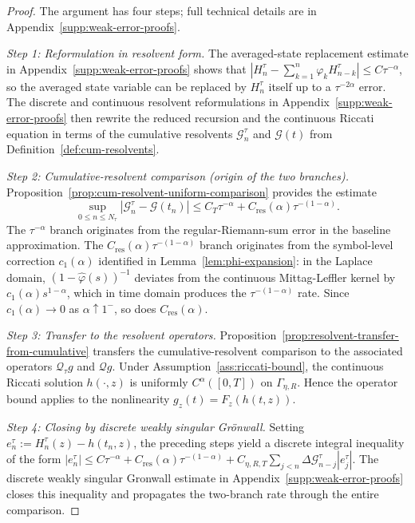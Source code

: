 \documentclass[letterpaper]{article}
\numberwithin{equation}{section}
\theoremstyle{definition}
\theoremstyle{remark}
\begin{document}
\begin{proof}
{The argument has four steps; full technical details are in Appendix~\ref{supp:weak-error-proofs}.

\medskip
\noindent\textit{Step 1: Reformulation in resolvent form.}
The averaged-state replacement estimate in Appendix~\ref{supp:weak-error-proofs} shows that
$|H_n^\tau - \sum_{k=1}^n\varphi_k H_{n-k}^\tau|\le C\tau^{-\alpha}$, so the averaged
state variable can be replaced by $H_n^\tau$ itself up to a $\tau^{-2\alpha}$
error. The discrete and continuous resolvent reformulations in Appendix~\ref{supp:weak-error-proofs} then
rewrite the reduced recursion and the continuous Riccati equation in terms of
the cumulative resolvents $\mathcal{G}_n^\tau$ and $\mathcal{G}(t)$ from
Definition~\ref{def:cum-resolvents}.

\medskip
\noindent\textit{Step 2: Cumulative-resolvent comparison (origin of the two branches).}
Proposition~\ref{prop:cum-resolvent-uniform-comparison} provides the estimate
\[
  \sup_{0\le n\le N_\tau}|\mathcal{G}_n^\tau-\mathcal{G}(t_n)|
  \le C_T\tau^{-\alpha}+C_{\mathrm{res}}(\alpha)\tau^{-(1-\alpha)}.
\]
The $\tau^{-\alpha}$ branch originates from the regular-Riemann-sum error in the baseline approximation. The $C_{\mathrm{res}}(\alpha)\tau^{-(1-\alpha)}$ branch originates from the symbol-level correction $c_1(\alpha)$ identified in Lemma~\ref{lem:phi-expansion}: in the Laplace domain, $(1-\hat\varphi(s))^{-1}$ deviates from the continuous Mittag-Leffler kernel by $c_1(\alpha)s^{1-\alpha}$, which in time domain produces the $\tau^{-(1-\alpha)}$ rate. Since $c_1(\alpha)\to0$ as $\alpha\uparrow1^-$, so does $C_{\mathrm{res}}(\alpha)$.

\medskip
\noindent\textit{Step 3: Transfer to the resolvent operators.}
Proposition~\ref{prop:resolvent-transfer-from-cumulative} transfers the
cumulative-resolvent comparison to the associated operators $\mathcal{Q}_\tau g$
and $\mathcal{Q}g$. Under Assumption~\ref{ass:riccati-bound}, the continuous
Riccati solution $h(\cdot,z)$ is uniformly $C^\alpha([0,T])$ on
$\Gamma_{\eta,R}$. Hence the operator bound applies to the nonlinearity
$g_z(t)=F_z(h(t,z))$.

\medskip
\noindent\textit{Step 4: Closing by discrete weakly singular Gr\"{o}nwall.}
Setting $e_n^\tau:=H_n^\tau(z)-h(t_n,z)$, the preceding steps yield a discrete
integral inequality of the form
$|e_n^\tau|\le C\tau^{-\alpha}+C_{\mathrm{res}}(\alpha)\tau^{-(1-\alpha)}+C_{\eta,R,T}\sum_{j<n}\Delta\mathcal{G}_{n-j}^\tau|e_j^\tau|$.
The discrete weakly singular Gronwall estimate in Appendix~\ref{supp:weak-error-proofs} closes this
inequality and propagates the two-branch rate through the entire comparison.}
\end{proof}
\end{document}
